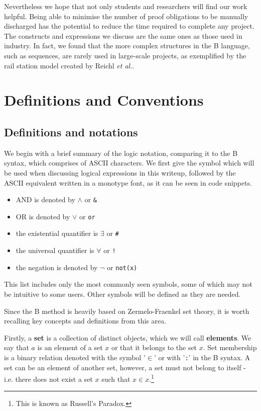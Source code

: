 \documentclass[12pt,journal,duplex]{IEEEtran}
\begin{document}
	Nevertheless we hope that not only students and researchers will find our work helpful. Being able to minimise the number of proof obligations to be manually discharged has the potential to reduce the time required to complete any project. The constructs and expressions we discuss are the same ones as those used in industry. In fact, we found that the more complex structures in the B language, such as sequences, are rarely used in large-scale projects, as exemplified by the rail station model created by Reichl \textit{et al.}\cite{station model}.
	\section{Definitions and Conventions}

	\subsection{Definitions and notations}
	We begin with a brief summary of the logic notation, comparing it to the B syntax, which comprises of ASCII characters. We first give the symbol which will be used when discussing logical expressions in this writeup, followed by the ASCII equivalent written in a monotype font, as it can be seen in code snippets.
	\begin{itemize}
		\item AND is denoted by $\wedge$ or \texttt{\&}
		\item OR is denoted by $\vee$ or \texttt{or}
		\item the existential quantifier is $\exists$ or \texttt{\#}
		\item the universal quantifier is $\forall$ or \texttt{!}
		\item the negation is denoted by $\neg$ or \texttt{not(x)}
	\end{itemize}
	This list includes only the most commonly seen symbols, some of which may not be intuitive to some users. Other symbols will be defined as they are needed.

	Since the B method is heavily based on Zermelo-Fraenkel set theory, it is worth recalling key concepts and definitions from this area.\cite{Goldrei}

	Firstly, a \textbf{set} is a collection of distinct objects, which we will call \textbf{elements}. We say that $a$ is an element of a set $x$ or that it belongs to the set $x$. Set membership is a binary relation denoted with the symbol '$\in$' or with '\texttt{:}' in the B syntax. A set can be an element of another set, however, a set must not belong to itself - i.e. there does not exist a set $x$ such that $x \in x$.\footnote{This is known as Russell's Paradox.}
\end{document}
